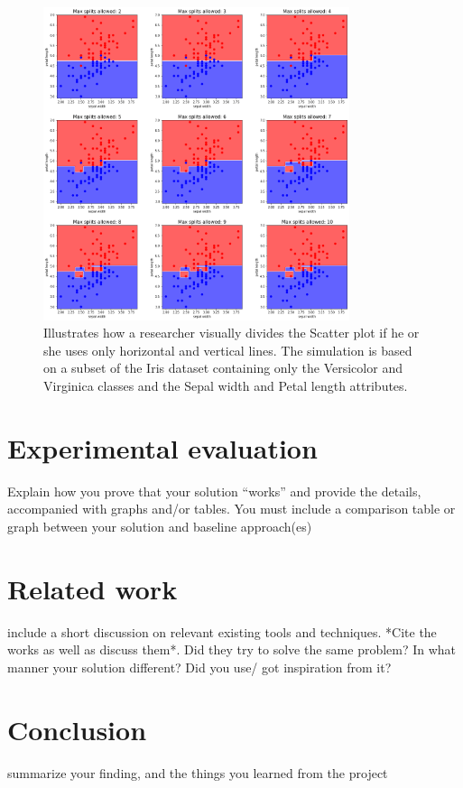 \documentclass[12pt]{article}
\begin{document}
\begin{figure}[h]
\includegraphics[width=0.8\textwidth]{scatter_plot_illustration.png}
\caption{Illustrates how a researcher visually divides the Scatter plot if he or she uses only horizontal and vertical lines. The simulation is based on a subset of the Iris dataset containing only the Versicolor and Virginica classes and the Sepal width and Petal length attributes.}
\label{fig:mylabel}
\end{figure}


\section{Experimental evaluation}\label{Experimental evaluation}
Explain how you prove that your solution
“works” and provide the details, accompanied with graphs and/or tables.
You must include a comparison table or graph between your solution and
baseline approach(es)

\section{Related work}\label{Related work}
include a short discussion on relevant existing tools and
techniques. *Cite the works as well as discuss them*. Did they try to
solve the same problem? In what manner your solution different? Did
you use/ got inspiration from it? 

\section{Conclusion}\label{Conclusion}
summarize your finding, and the things you learned from
the project



\end{document}
